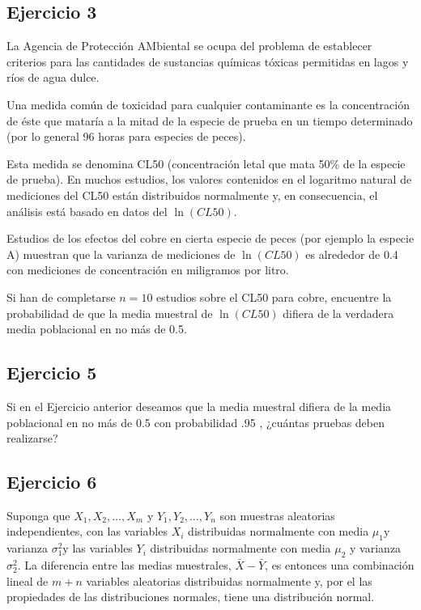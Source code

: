 \documentclass[
]{article}
\begin{document}
\subsection{Ejercicio 3}\label{ejercicio-3-1}

La Agencia de Protección AMbiental se ocupa del problema de establecer criterios para las cantidades de sustancias químicas tóxicas permitidas en lagos y ríos de agua dulce.

Una medida común de toxicidad para cualquier contaminante es la concentración de éste que mataría a la mitad de la especie de prueba en un tiempo determinado (por lo general 96 horas para especies de peces).

Esta medida se denomina CL50 (concentración letal que mata 50\% de la especie de prueba). En muchos estudios, los valores contenidos en el logaritmo natural de mediciones del CL50 están distribuidos normalmente y, en consecuencia, el análisis está basado en datos del \(\ln(CL50)\).

Estudios de los efectos del cobre en cierta especie de peces (por ejemplo la especie A) muestran que la varianza de mediciones de \(\ln(CL50)\) es alrededor de 0.4 con mediciones de concentración en miligramos por litro.

Si han de completarse \(n=10\) estudios sobre el CL50 para cobre, encuentre la probabilidad de que la media muestral de \(\ln(CL50)\) difiera de la verdadera media poblacional en no más de 0.5.

\subsection{Ejercicio 5}\label{ejercicio-5-1}

Si en el Ejercicio anterior deseamos que la media muestral difiera de la media poblacional en no más de 0.5 con probabilidad .95 , ¿cuántas pruebas deben realizarse?

\subsection{Ejercicio 6}\label{ejercicio-6-1}

Suponga que \(X_{1}, X_{2}, \ldots, X_{m}\) y \(Y_{1}, Y_{2}, \ldots, Y_{n}\) son muestras aleatorias independientes, con las variables \(X_{i}\) distribuidas normalmente con media \(\mu_{1} \mathrm{y}\) varianza \(\sigma_{1}^{2} \mathrm{y}\) las variables \(Y_{i}\) distribuidas normalmente con media \(\mu_{2}\) y varianza \(\sigma_{2}^{2}\). La diferencia entre las medias muestrales, \(\bar{X}-\bar{Y}\), es entonces una combinación lineal de \(m+n\) variables aleatorias distribuidas normalmente y, por el las propiedades de las distribuciones normales, tiene una distribución normal.
\end{document}
